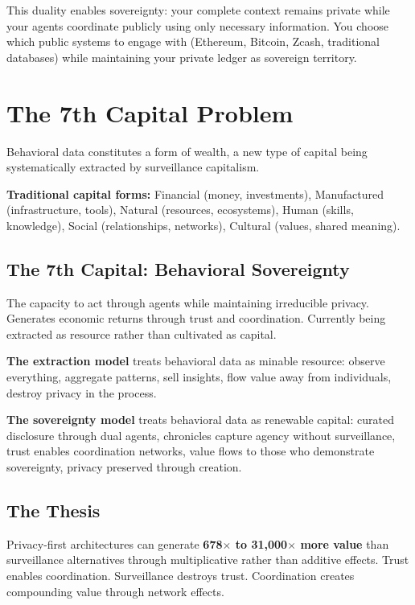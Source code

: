 \documentclass[11pt,a4paper]{article}
\theoremstyle{definition}
\begin{document}
This duality enables sovereignty: your complete context remains private while your agents coordinate publicly using only necessary information. You choose which public systems to engage with (Ethereum, Bitcoin, Zcash, traditional databases) while maintaining your private ledger as sovereign territory.

\section{The 7th Capital Problem}

Behavioral data constitutes a form of wealth, a new type of capital being systematically extracted by surveillance capitalism.

\textbf{Traditional capital forms:} Financial (money, investments), Manufactured (infrastructure, tools), Natural (resources, ecosystems), Human (skills, knowledge), Social (relationships, networks), Cultural (values, shared meaning).

\subsection{The 7th Capital: Behavioral Sovereignty}

The capacity to act through agents while maintaining irreducible privacy. Generates economic returns through trust and coordination. Currently being extracted as resource rather than cultivated as capital.

\textbf{The extraction model} treats behavioral data as minable resource: observe everything, aggregate patterns, sell insights, flow value away from individuals, destroy privacy in the process.

\textbf{The sovereignty model} treats behavioral data as renewable capital: curated disclosure through dual agents, chronicles capture agency without surveillance, trust enables coordination networks, value flows to those who demonstrate sovereignty, privacy preserved through creation.

\subsection{The Thesis}

Privacy-first architectures can generate \textbf{678$\times$ to 31,000$\times$ more value} than surveillance alternatives through multiplicative rather than additive effects. Trust enables coordination. Surveillance destroys trust. Coordination creates compounding value through network effects.
\end{document}
